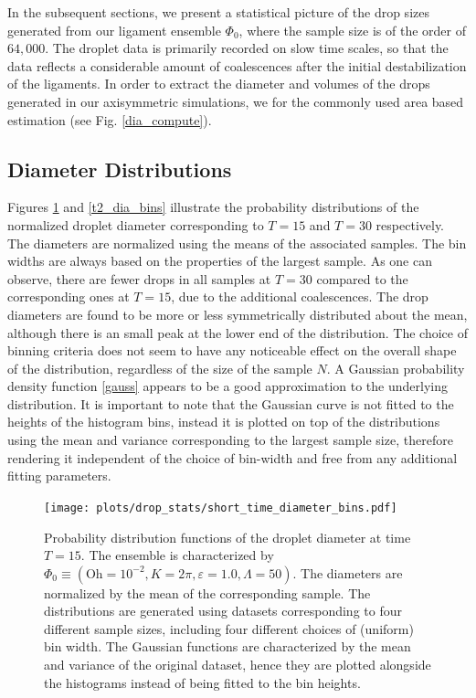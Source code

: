 In the subsequent sections, we present a statistical picture of the drop sizes generated 
from our ligament ensemble $\Phi_0$, where the sample size is of the order of $64,000$.
The droplet data is primarily recorded on slow time scales, so that the data reflects 
a considerable amount of coalescences after the initial destabilization of the ligaments. 
In order to extract the diameter and volumes of the drops generated in our axisymmetric
simulations, we for the commonly used area based estimation (see Fig. \ref{dia_compute}).


\subsection*{Diameter Distributions}

Figures \ref{t1_dia_bins} and \ref{t2_dia_bins} illustrate the probability distributions
of the normalized droplet diameter corresponding to $T=15$ and $T=30$ respectively. 
The diameters are normalized using the means of the associated samples. 
The bin widths are always based on the properties of the largest sample.
As one can observe, there are fewer drops in all samples at $T=30$ 
compared to the corresponding ones at $T=15$, due to the additional coalescences.  
The drop diameters are found to be more or less symmetrically distributed about the mean,
although there is an small peak at the lower end of the distribution.
The choice of binning criteria does not seem to have any noticeable effect on the 
overall shape of the distribution, regardless of the size of the sample $N$.   
A Gaussian probability density function \eqref{gauss} appears to be a good 
approximation to the underlying distribution.
It is important to note that the Gaussian curve is not fitted to the heights of the 
histogram bins, instead it is plotted on top of the distributions using the mean and 
variance corresponding to the largest sample size, therefore rendering it independent
of the choice of bin-width and free from any additional fitting parameters.  


\begin{figure}
\centering
\texttt{[image: plots/drop\_stats/short\_time\_diameter\_bins.pdf]}
\caption{Probability distribution functions of the droplet diameter at time $T = 15$. 
	The ensemble is characterized by $\Phi_0 \equiv \left( \textrm{Oh} = 10^{-2}, K = 2\pi , \varepsilon = 1.0 , \Lambda = 50 \right)$. 
The diameters are normalized by the mean of the corresponding sample.  
The distributions are generated using datasets corresponding to four different sample sizes, 
including four different choices of (uniform) bin width. 
The Gaussian functions are characterized by the mean and variance of the original dataset, 
hence they are plotted alongside the histograms instead of being fitted to the bin heights.
	}
\label{t1_dia_bins}
\end{figure}


